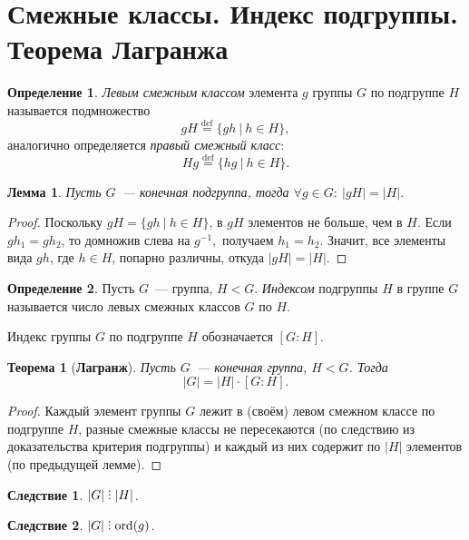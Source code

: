 \documentclass[a4paper, 14pt]{extarticle}
\newcommand{\deq}{\stackrel{\mathrm{def}}{=}}
\newcommand{\n}{\par}
\newcommand{\ord}{\mathrm{ord}}
\DeclareRobustCommand{\divby}{%
	\mathrel{\text{\vbox{\baselineskip.65ex\lineskiplimit0pt\hbox{.}\hbox{.}\hbox{.}}}}%
}
\theoremstyle{definition}
\newtheorem{definition}{Определение}
\theoremstyle{plain}
\newtheorem*{theorem*}{Теорема}
\numberwithin{theorem}{section}
\numberwithin{definition}{section}
\numberwithin{statement}{section}
\newtheorem{lemma}{Лемма}
\numberwithin{lemma}{section}
\newtheorem{consequence}{Следствие}
\numberwithin{consequence}{section}
\begin{document}
	\section{Смежные классы. Индекс подгруппы. Теорема Лагранжа}
	\setcounter{definition}{0}
	\begin{definition}
		\textit{Левым смежным классом} элемента $g$ группы $G$ по подгруппе $H$ называется подмножество
		\begin{equation*}
			gH \deq \{gh \ | \ h \in H\},
		\end{equation*}
		аналогично определяется \textit{правый смежный класс}:
		\begin{equation*}
			Hg \deq \{hg \ | \ h \in H\}.
		\end{equation*}
	\end{definition}
	\begin{lemma}
		Пусть $G$~--- конечная подгруппа, тогда $\forall g \in G{:} \ |gH| = |H|.$
	\end{lemma}
	\begin{proof}
		Поскольку ${gH = \{gh \ | \ h \in H\}}$, в $gH$ элементов не больше, чем в $H$. Если ${gh_1 = gh_2}$, то домножив слева на $g^{-1},$ получаем ${h_1 = h_2}$. Значит, все элементы вида $gh$, где ${h \in H}$, попарно различны, откуда ${|gH| = |H|}$.
	\end{proof}
	\begin{definition}
		Пусть $G$~--- группа, $H < G$. \textit{Индексом} подгруппы $H$ в группе $G$ называется число левых смежных классов $G$ по $H$.
	\end{definition} \n
	Индекс группы $G$ по подгруппе $H$ обозначается $[G : H]$.
	\begin{theorem*}[\textbf{Лагранж}]
		Пусть $G$~--- конечная группа, $H < G$. Тогда
		\begin{equation*}
			|G| = |H| \cdot [G : H].
		\end{equation*}
	\end{theorem*}
	\begin{proof}
		Каждый элемент группы $G$ лежит в (своём) левом смежном классе по подгруппе $H$, разные смежные классы не пересекаются (по следствию из доказательства критерия подгруппы) и каждый из них содержит по $|H|$ элементов (по предыдущей лемме).
	\end{proof}
	\newpage
	\begin{consequence}
		$|G| \divby |H|$.
	\end{consequence}
	\begin{consequence}
		$|G| \divby \ord(g)$.
	\end{consequence}
\end{document}
